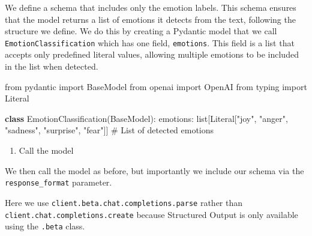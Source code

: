 \documentclass[
  letterpaper,
  DIV=11,
  numbers=noendperiod]{scrreprt}
\newenvironment{Shaded}{\begin{snugshade}}{\end{snugshade}}
\newcommand{\BuiltInTok}[1]{\textcolor[rgb]{0.00,0.23,0.31}{#1}}
\newcommand{\CommentTok}[1]{\textcolor[rgb]{0.37,0.37,0.37}{#1}}
\newcommand{\ImportTok}[1]{\textcolor[rgb]{0.00,0.46,0.62}{#1}}
\newcommand{\KeywordTok}[1]{\textcolor[rgb]{0.00,0.23,0.31}{\textbf{#1}}}
\newcommand{\NormalTok}[1]{\textcolor[rgb]{0.00,0.23,0.31}{#1}}
\newcommand{\StringTok}[1]{\textcolor[rgb]{0.13,0.47,0.30}{#1}}
\providecommand{\tightlist}{%
  \setlength{\itemsep}{0pt}\setlength{\parskip}{0pt}}\usepackage{longtable,booktabs,array}
\begin{document}
We define a schema that includes only the emotion labels. This schema
ensures that the model returns a list of emotions it detects from the
text, following the structure we define. We do this by creating a
Pydantic model that we call \texttt{EmotionClassification} which has one
field, \texttt{emotions}. This field is a list that accepts only
predefined literal values, allowing multiple emotions to be included in
the list when detected.

\begin{Shaded}
\begin{Highlighting}[]
\ImportTok{from}\NormalTok{ pydantic }\ImportTok{import}\NormalTok{ BaseModel}
\ImportTok{from}\NormalTok{ openai }\ImportTok{import}\NormalTok{ OpenAI}
\ImportTok{from}\NormalTok{ typing }\ImportTok{import}\NormalTok{ Literal}

\KeywordTok{class}\NormalTok{ EmotionClassification(BaseModel):}
\NormalTok{    emotions: }\BuiltInTok{list}\NormalTok{[Literal[}\StringTok{"joy"}\NormalTok{, }\StringTok{"anger"}\NormalTok{, }\StringTok{"sadness"}\NormalTok{, }\StringTok{"surprise"}\NormalTok{, }\StringTok{"fear"}\NormalTok{]]  }\CommentTok{\# List of detected emotions}
\end{Highlighting}
\end{Shaded}

\begin{enumerate}
\def\labelenumi{\arabic{enumi}.}
\setcounter{enumi}{1}
\tightlist
\item
  Call the model
\end{enumerate}

We then call the model as before, but importantly we include our schema
via the \texttt{response\_format} parameter.

\begin{tcolorbox}[enhanced jigsaw, colback=white, opacitybacktitle=0.6, coltitle=black, left=2mm, breakable, bottomtitle=1mm, toptitle=1mm, toprule=.15mm, colframe=quarto-callout-note-color-frame, titlerule=0mm, title=\textcolor{quarto-callout-note-color}{\faInfo}\hspace{0.5em}{Note}, colbacktitle=quarto-callout-note-color!10!white, rightrule=.15mm, bottomrule=.15mm, arc=.35mm, opacityback=0, leftrule=.75mm]

Here we use \texttt{client.beta.chat.completions.parse} rather than
\texttt{client.chat.completions.create} because Structured Output is
only available using the \texttt{.beta} class.

\end{tcolorbox}
\end{document}
